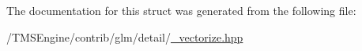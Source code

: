 The documentation for this struct was generated from the following file\+:\begin{DoxyCompactItemize}
\item 
/\+T\+M\+S\+Engine/contrib/glm/detail/\hyperlink{__vectorize_8hpp}{\+\_\+vectorize.\+hpp}\end{DoxyCompactItemize}
